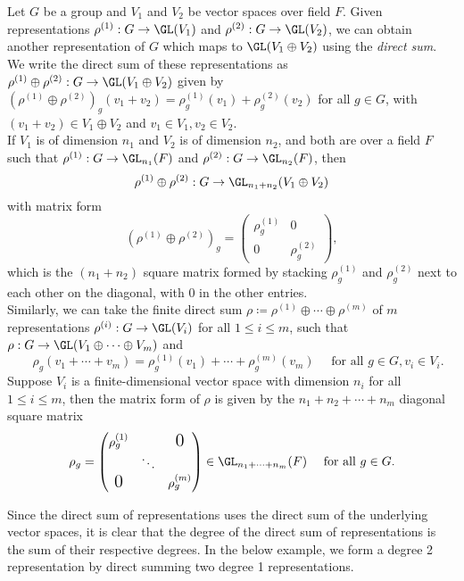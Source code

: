 \documentclass[../Project.tex]{subfiles}
\begin{document}
\begin{defi}
\label{directsumofrep}
	Let $G$ be a group and $V_1$ and $V_2$ be vector spaces over field $F$. Given representations $\rho^{(1)} : G \to \GL(V_1)$ and $\rho^{(2)} : G \to \GL(V_2)$, we can obtain another representation of $G$ which maps to $\GL(V_1 \oplus V_2)$ using the \textit{direct sum}. We write the direct sum of these representations as $\rho^{(1)} \oplus \rho^{(2)} : G \to \GL(V_1 \oplus V_2)$ given by $(\rho^{(1)} \oplus \rho^{(2)})_g(v_1+v_2) = \rho^{(1)}_g(v_1)+\rho^{(2)}_g(v_2)$ for all $g\in G$, with $(v_1+v_2) \in V_1 \oplus V_2$ and $v_1 \in V_1,v_2 \in V_2$.\\

	If $V_1$ is of dimension $n_1$ and $V_2$ is of dimension $n_2$, and both are over a field $F$ such that $\rho^{(1)} : G \to \GL_{n_1}(F)$ and $\rho^{(2)} : G \to \GL_{n_2}(F)$, then
	$$\rho^{(1)} \oplus \rho^{(2)} : G \to \GL_{n_1 + n_2}(V_1 \oplus V_2)$$
	with matrix form
	$$ (\rho^{(1)} \oplus \rho^{(2)})_g =
	\begin{pmatrix}
		\rho^{(1)}_g & 0\\ 0 & \rho^{(2)}_g	
	\end{pmatrix},$$
	which is the $(n_1 + n_2)$ square matrix formed by stacking $\rho^{(1)}_g$ and $\rho^{(2)}_g$ next to each other on the diagonal, with $0$ in the other entries.\\

	Similarly, we can take the finite direct sum $\rho \coloneqq \rho^{(1)} \oplus \cdots \oplus \rho^{(m)}$ of $m$ representations $\rho^{(i)} : G \to \GL(V_i)$ for all $1 \leqslant i \leqslant m$, such that
	$\rho : G \to \GL(V_1 \oplus \cdots \oplus V_m)$ and
	$$\quad \rho_g(v_1+\cdots+v_m) = \rho^{(1)}_g(v_1)+\cdots+\rho^{(m)}_g(v_m) \quad \text{ for all } g \in G, v_i \in V_i.$$
	Suppose $V_i$ is a finite-dimensional vector space with dimension $n_i$ for all $1 \leqslant i \leqslant m$, then the matrix form of $\rho$ is given by the $n_1 + n_2 + \cdots + n_m$ diagonal square matrix
		$$\rho_g = \begin{pmatrix} 
	    \rho_g^{(1)} &  &\Large{\text{0}} \\
	     & \ddots & \\
	    \Large{\text{0}} &  &\rho^{(m)}_g 
		\end{pmatrix} \in \GL_{n_1 + \cdots + n_m}(F) \quad \text{ for all } g \in G.$$
\end{defi}

Since the direct sum of representations uses the direct sum of the underlying vector spaces, it is clear that the degree of the direct sum of representations is the sum of their respective degrees. In the below example, we form a degree 2 representation by direct summing two degree 1 representations.
\end{document}
